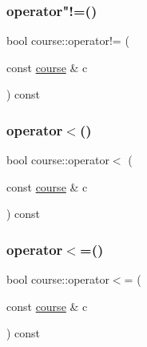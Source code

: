 \hypertarget{classcourse_ae01c5e2445600d485da28e0ba7c48b3a}{}\label{classcourse_ae01c5e2445600d485da28e0ba7c48b3a} 
\subsubsection{\texorpdfstring{operator"!=()}{operator!=()}}
{\footnotesize\ttfamily bool course\+::operator!= (\begin{DoxyParamCaption}\item[{const \hyperlink{classcourse}{course} \&}]{c }\end{DoxyParamCaption}) const\hspace{0.3cm}{\ttfamily [inline]}}

\hypertarget{classcourse_aa47eab66d21e10a44ff77f634406face}{}\label{classcourse_aa47eab66d21e10a44ff77f634406face} 
\subsubsection{\texorpdfstring{operator$<$()}{operator<()}}
{\footnotesize\ttfamily bool course\+::operator$<$ (\begin{DoxyParamCaption}\item[{const \hyperlink{classcourse}{course} \&}]{c }\end{DoxyParamCaption}) const\hspace{0.3cm}{\ttfamily [inline]}}

\hypertarget{classcourse_ab96de818d7b97e4e259fc6add5e0bc54}{}\label{classcourse_ab96de818d7b97e4e259fc6add5e0bc54} 
\subsubsection{\texorpdfstring{operator$<$=()}{operator<=()}}
{\footnotesize\ttfamily bool course\+::operator$<$= (\begin{DoxyParamCaption}\item[{const \hyperlink{classcourse}{course} \&}]{c }\end{DoxyParamCaption}) const\hspace{0.3cm}{\ttfamily [inline]}}

\hypertarget{classcourse_aafce75fc85cdb94a5a08eaaba359da16}{}\label{classcourse_aafce75fc85cdb94a5a08eaaba359da16} 
